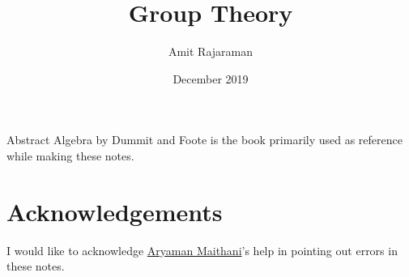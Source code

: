 \documentclass{article}
\title{Group Theory}
\author{Amit Rajaraman}
\date{December 2019}
\numberwithin{equation}{section}
\theoremstyle{definition}
\numberwithin{definition}{section}
\numberwithin{theorem}{section}
\theoremstyle{remark}
\numberwithin{exercise}{section}
\begin{document}
\maketitle
\thispagestyle{empty}

Abstract Algebra by Dummit and Foote \cite{dummyfeet} is the book primarily used as reference while making these notes.

\tableofcontents
\clearpage






\section*{Acknowledgements}
    I would like to acknowledge \href{https://aryamanmaithani.github.io/}{Aryaman Maithani}'s help in pointing out errors in these notes.
    
    
    
    
    
    
\end{document}
